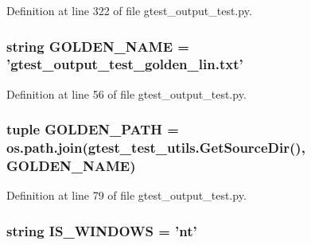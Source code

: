 \-Definition at line 322 of file gtest\-\_\-output\-\_\-test.\-py.

\hypertarget{namespacegtest__output__test_ad363abe54f765870f1e0b636207cf8c6}{
\subsubsection[{\-G\-O\-L\-D\-E\-N\-\_\-\-N\-A\-M\-E}]{\setlength{\rightskip}{0pt plus 5cm}string {\bf \-G\-O\-L\-D\-E\-N\-\_\-\-N\-A\-M\-E} = 'gtest\-\_\-output\-\_\-test\-\_\-golden\-\_\-lin.\-txt'}}\label{d6/dc2/namespacegtest__output__test_ad363abe54f765870f1e0b636207cf8c6}


\-Definition at line 56 of file gtest\-\_\-output\-\_\-test.\-py.

\hypertarget{namespacegtest__output__test_aac7d32261d969f8beb576a4612f08312}{
\subsubsection[{\-G\-O\-L\-D\-E\-N\-\_\-\-P\-A\-T\-H}]{\setlength{\rightskip}{0pt plus 5cm}tuple {\bf \-G\-O\-L\-D\-E\-N\-\_\-\-P\-A\-T\-H} = os.\-path.\-join({\bf gtest\-\_\-test\-\_\-utils.\-Get\-Source\-Dir}(), {\bf \-G\-O\-L\-D\-E\-N\-\_\-\-N\-A\-M\-E})}}\label{d6/dc2/namespacegtest__output__test_aac7d32261d969f8beb576a4612f08312}


\-Definition at line 79 of file gtest\-\_\-output\-\_\-test.\-py.

\hypertarget{namespacegtest__output__test_ab1b21b880253abfa3ab3dfc19b06814c}{
\subsubsection[{\-I\-S\-\_\-\-W\-I\-N\-D\-O\-W\-S}]{\setlength{\rightskip}{0pt plus 5cm}string {\bf \-I\-S\-\_\-\-W\-I\-N\-D\-O\-W\-S} = 'nt'}}\label{d6/dc2/namespacegtest__output__test_ab1b21b880253abfa3ab3dfc19b06814c}


